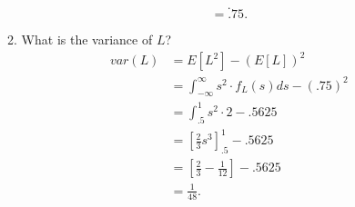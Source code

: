 \documentclass[a4paper]{article}
\begin{document}
\begin{enumerate}
\begin{enumerate}
\[                .\] 
                \[
                = .75
                .\] 
              \item What is the variance of $L$?
                \begin{align*}
                  var(L) &= E[L^2] - (E[L])^2  \\
                         &= \int_{-\infty}^{\infty} s^2 \cdot f_L(s) ds - (.75)^2 \\
                         &= \int_{.5}^1 s^2 \cdot 2 - .5625 \\
                         &= [\frac{2}{3}s^3]_{.5}^1 - .5625 \\
                         &= [\frac{2}{3} - \frac{1}{12}] - .5625 \\
                         &= \frac{1}{48}
                .\end{align*}
            \end{enumerate}
\end{enumerate}
\end{document}

